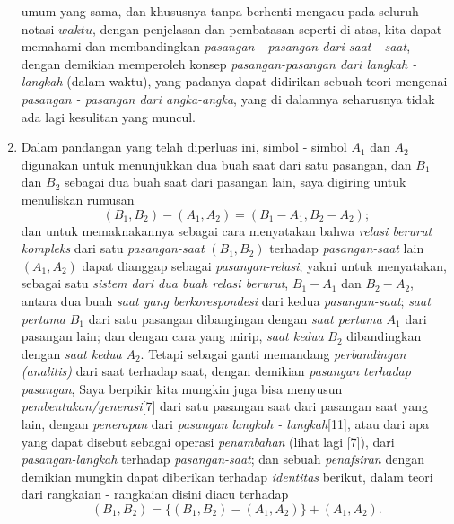 \documentclass[a4paper, 12pt]{book}
\begin{document}
\begin{enumerate}
umum yang sama, dan khususnya tanpa berhenti mengacu pada seluruh notasi 
$waktu$, dengan penjelasan dan pembatasan seperti di atas, kita dapat memahami
dan membandingkan \textit{pasangan - pasangan dari saat - saat}, dengan 
demikian memperoleh konsep \textit{pasangan-pasangan dari langkah - langkah}
 (dalam waktu), yang padanya dapat didirikan sebuah teori mengenai 
\textit{pasangan - pasangan dari angka-angka}, yang di dalamnya seharusnya 
tidak ada lagi kesulitan yang muncul.  
\item Dalam pandangan yang telah diperluas ini, simbol - simbol $A_1$ dan $A_2$
digunakan untuk menunjukkan dua buah saat dari satu pasangan, dan $B_1$ 
dan $B_2$ sebagai dua buah saat dari pasangan lain, saya digiring untuk 
menuliskan rumusan
\[
(B_1, B_2) - (A_1, A_2) = (B_1 - A_1, B_2 - A_2);
\]
dan untuk memaknakannya sebagai cara menyatakan bahwa 
\textit{relasi berurut kompleks} dari satu \textit{pasangan-saat} $(B_1, B_2)$
terhadap \textit{pasangan-saat} lain $(A_1, A_2)$ dapat dianggap sebagai 
\textit{pasangan-relasi}; yakni untuk menyatakan, sebagai satu 
\textit{sistem dari dua buah relasi berurut}, $B_1 - A_1$ dan $B_2 - A_2$, 
antara dua buah \textit{saat yang berkorespondesi} dari kedua 
\textit{pasangan-saat}; \textit{saat pertama} $B_1$ dari satu pasangan 
dibangingan dengan \textit{saat pertama} $A_1$ dari pasangan lain; 
dan dengan cara yang mirip, 
\textit{saat kedua} $B_2$ dibandingkan dengan \textit{saat kedua} $A_2$. 
Tetapi sebagai ganti memandang \textit{perbandingan (analitis)} dari saat 
terhadap saat, dengan demikian \textit{pasangan terhadap pasangan}, Saya 
berpikir kita mungkin juga bisa menyusun \textit{pembentukan/generasi}[7]
dari satu pasangan saat dari pasangan saat yang lain, dengan \textit{penerapan} 
dari \textit{pasangan langkah - langkah}[11], atau dari apa yang dapat disebut
sebagai operasi \textit{penambahan} (lihat lagi [7]), 
dari \textit{pasangan-langkah} terhadap \textit{pasangan-saat}; dan sebuah 
\textit{penafsiran} dengan demikian mungkin dapat diberikan terhadap
\textit{identitas} berikut, dalam teori dari rangkaian - rangkaian disini 
diacu terhadap
\[
(B_1, B_2) = \{(B_1, B_2) - (A_1, A_2)\} + (A_1, A_2).
\]


\end{enumerate}
\end{document}
